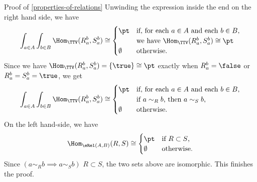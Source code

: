 \begin{Proof}{Proof of \cref{properties-of-relations}}%
    Unwinding the expression inside the end on the right hand side, we have
    \[
        \int_{a\in A}\int_{b\in B}\Hom_{\TTV}(R^{b}_{a},S^{b}_{a})%
        \cong%
        \begin{cases}%
            \pt       &\text{if, for each $a\in A$ and each $b\in B$,}\\%
                      &\text{we have $\Hom_{\TTV}(R^{b}_{a},S^{b}_{a})\cong\pt$}\\%
            \emptyset &\text{otherwise.}%
        \end{cases}%
    \]%
    Since we have $\Hom_{\TTV}(R^{b}_{a},S^{b}_{a})=\{\true\}\cong\pt$ exactly when $R^{b}_{a}=\false$ or $R^{b}_{a}=S^{b}_{a}=\true$, we get
    \[
        \int_{a\in A}\int_{b\in B}\Hom_{\TTV}(R^{b}_{a},S^{b}_{a})%
        \cong%
        \begin{cases}%
            \pt       &\text{if, for each $a\in A$ and each $b\in B$,}\\%
                      &\text{if $a\sim_{R}b$, then $a\sim_{S}b$,}\\%
            \emptyset &\text{otherwise.}%
        \end{cases}%
    \]%
    On the left hand-side, we have
    \[
        \Hom_{\eRel(A,B)}(R,S)%
        \cong%
        \begin{cases}%
            \pt       &\text{if $R\subset S$,}\\%
            \emptyset &\text{otherwise.}%
        \end{cases}%
    \]%
    Since $(a\sim_{R}b\implies a\sim_{S}b)$ \textiff $R\subset S$, the two sets above are isomorphic. This finishes the proof.
\end{Proof}
